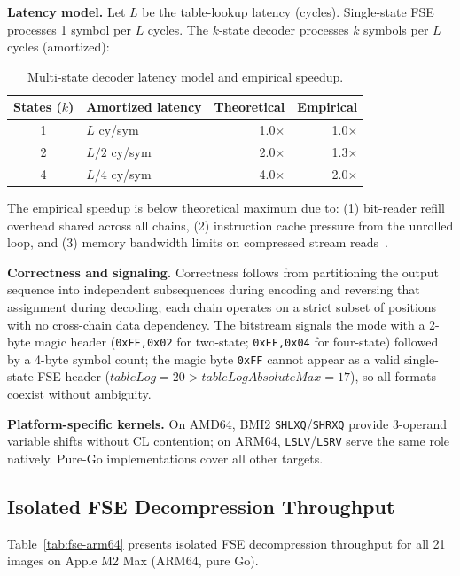 \documentclass[journal]{IEEEtran}
\begin{document}
\textbf{Latency model.} Let $L$ be the table-lookup latency (cycles).
Single-state FSE processes 1 symbol per $L$ cycles. The $k$-state decoder
processes $k$ symbols per $L$ cycles (amortized):

\begin{table}[htbp]
\centering
\caption{Multi-state decoder latency model and empirical speedup.}
\label{tab:latency}
\begin{tabular}{clrr}
\toprule
States ($k$) & Amortized latency & Theoretical & Empirical \\
\midrule
1 & $L$ cy/sym & 1.0$\times$ & 1.0$\times$ \\
2 & $L/2$ cy/sym & 2.0$\times$ & 1.3$\times$ \\
4 & $L/4$ cy/sym & 4.0$\times$ & 2.0$\times$ \\
\bottomrule
\end{tabular}
\end{table}

The empirical speedup is below theoretical maximum due to: (1) bit-reader
refill overhead shared across all chains, (2) instruction cache pressure from
the unrolled loop, and (3) memory bandwidth limits on compressed stream
reads~\cite{williams2009}.

\textbf{Correctness and signaling.} Correctness follows from partitioning the
output sequence into independent subsequences during encoding and reversing
that assignment during decoding; each chain operates on a strict subset of
positions with no cross-chain data dependency. The bitstream signals the mode
with a 2-byte magic header (\texttt{0xFF,0x02} for two-state;
\texttt{0xFF,0x04} for four-state) followed by a 4-byte symbol count; the
magic byte \texttt{0xFF} cannot appear as a valid single-state FSE header
($\textit{tableLog}=20 > \textit{tableLogAbsoluteMax}=17$), so all formats
coexist without ambiguity.

\textbf{Platform-specific kernels.} On AMD64, BMI2 \texttt{SHLXQ}/\texttt{SHRXQ}
provide 3-operand variable shifts without CL contention; on ARM64,
\texttt{LSLV}/\texttt{LSRV} serve the same role natively. Pure-Go
implementations cover all other targets.

\subsection{Isolated FSE Decompression Throughput}

Table~\ref{tab:fse-arm64} presents isolated FSE decompression throughput for
all 21 images on Apple M2 Max (ARM64, pure Go).
\end{document}
